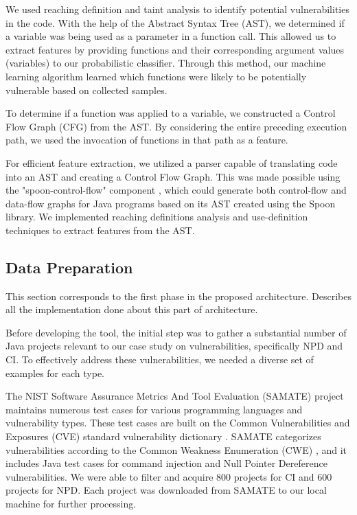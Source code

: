\documentclass[journal,a4paper]{IEEEtran}
\begin{document}
We used reaching definition and taint analysis to identify potential vulnerabilities in the code. With the help of the Abstract Syntax Tree (AST), we determined if a variable was being used as a parameter in a function call. This allowed us to extract features by providing functions and their corresponding argument values (variables) to our probabilistic classifier. Through this method, our machine learning algorithm learned which functions were likely to be potentially vulnerable based on collected samples.

To determine if a function was applied to a variable, we constructed a Control Flow Graph (CFG) from the AST. By considering the entire preceding execution path, we used the invocation of functions in that path as a feature.

For efficient feature extraction, we utilized a parser capable of translating code into an AST and creating a Control Flow Graph. This was made possible using the "spoon-control-flow" component \cite{OW2_SPOON}, which could generate both control-flow and data-flow graphs for Java programs based on its AST created using the Spoon library. We implemented reaching definitions analysis and use-definition techniques to extract features from the AST.

\subsection{Data Preparation}

This section corresponds to the first phase in the proposed architecture. Describes all the implementation done about this part of architecture.

Before developing the tool, the initial step was to gather a substantial number of Java projects relevant to our case study on vulnerabilities, specifically NPD and CI. To effectively address these vulnerabilities, we needed a diverse set of examples for each type.

The NIST Software Assurance Metrics And Tool Evaluation (SAMATE) project maintains numerous test cases for various programming languages and vulnerability types. These test cases are built on the Common Vulnerabilities and Exposures (CVE) standard vulnerability dictionary \cite{CVE_2023}. SAMATE categorizes vulnerabilities according to the Common Weakness Enumeration (CWE) \cite{CVE476}, and it includes Java test cases for command injection and Null Pointer Dereference vulnerabilities. We were able to filter and acquire 800 projects for CI and 600 projects for NPD. Each project was downloaded from SAMATE to our local machine for further processing.
\end{document}
